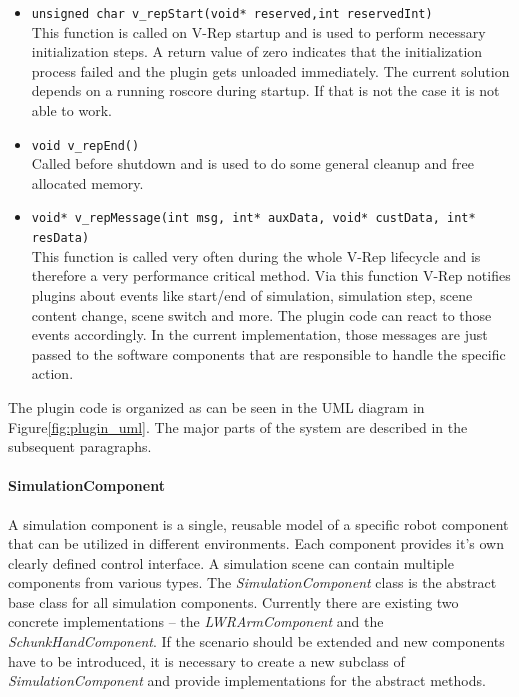 \begin{itemize}

\item \texttt{unsigned char v\_repStart(void* reserved,int reservedInt)} \\
This function is called on V-Rep startup and is used to perform necessary initialization steps. A return value of zero indicates that the initialization process failed and the plugin gets unloaded immediately. The current solution depends on a running roscore during startup. If that is not the case it is not able to work.

\item \texttt{void v\_repEnd()} \\
Called before shutdown and is used to do some general cleanup and free allocated memory.

\item \texttt{void* v\_repMessage(int msg, int* auxData, void* custData, int* resData)} \\
This function is called very often during the whole V-Rep lifecycle and is therefore a very performance critical method. Via this function V-Rep notifies plugins about events like start/end of simulation, simulation step, scene content change, scene switch and more. The plugin code can react to those events accordingly. In the current implementation, those messages are just passed to the software components that are responsible to handle the specific action. 
  
\end{itemize}

The plugin code is organized as can be seen in the UML diagram in Figure\ref{fig:plugin_uml}. The major parts of the system are described in the subsequent paragraphs.

\paragraph{SimulationComponent}

A simulation component is a single, reusable model of a specific robot component that can be utilized in different environments. Each component provides it's own clearly defined control interface. A simulation scene can contain multiple components from various types. The \emph{SimulationComponent} class is the abstract base class for all simulation components. Currently there are existing two concrete implementations -- the \emph{LWRArmComponent} and the \emph{SchunkHandComponent}. If the scenario should be extended and new components have to be introduced, it is necessary to create a new subclass of \emph{SimulationComponent} and provide implementations for the abstract methods. 

